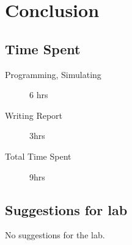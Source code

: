 \documentclass[11pt]{article}
\begin{document}
\section{Conclusion}

\subsection{Time Spent}

\begin{description}
	\item[Programming, Simulating] 6 hrs
 	\item[Writing Report] 3hrs
	\item[Total Time Spent] 9hrs
\end{description}

\subsection{Suggestions for lab}

No suggestions for the lab.
\end{document}

